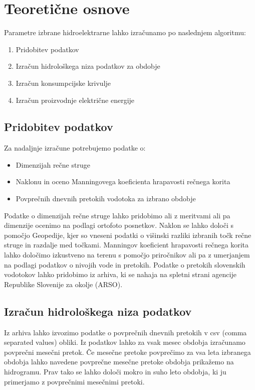 \chapter{Teoretične osnove}

Parametre izbrane hidroelektrarne lahko izračunamo po naslednjem algoritmu:
\begin{enumerate}[noitemsep, topsep=0pt]
	\item Pridobitev podatkov
	\item Izračun hidrološkega niza podatkov za obdobje
	\item Izračun konsumpcijske krivulje
	\item Izračun proizvodnje električne energije
\end{enumerate}


\section{Pridobitev podatkov}
Za nadaljnje izračune potrebujemo podatke o:
\begin{itemize}[noitemsep, topsep=0pt]
	\item Dimenzijah rečne struge
	\item Naklonu in oceno Manningovega koeficienta hrapavosti rečnega korita
	\item Povprečnih dnevnih pretokih vodotoka za izbrano obdobje
\end{itemize}

Podatke o dimenzijah rečne struge lahko pridobimo ali z meritvami ali pa dimenzije ocenimo na podlagi ortofoto posnetkov. Naklon se lahko določi s pomočjo Geopedije, kjer so vneseni podatki o višinski razliki izbranih točk rečne struge in razdalje med točkami. Manningov koeficient hrapavosti rečnega korita lahko določimo izkustveno na terenu s pomočjo priročnikov ali pa z umerjanjem na podlagi podatkov o nivojih vode in pretokih. Podatke o pretokih slovenskih vodotokov lahko pridobimo iz arhiva, ki se nahaja na spletni strani agencije Republike Slovenije za okolje (ARSO).




\section{Izračun hidrološkega niza podatkov}
Iz arhiva lahko izvozimo podatke o povprečnih dnevnih pretokih v csv (comma separated values) obliki. Iz podatkov lahko za vsak mesec obdobja izračunamo povprečni mesečni pretok. Če mesečne pretoke povprečimo za vsa leta izbranega obdobja lahko navedene povprečne mesečne pretoke obdobja prikažemo na hidrogramu. Prav tako se lahko določi mokro in suho leto obdobja, ki ju primerjamo z povprečnimi mesečnimi pretoki.



